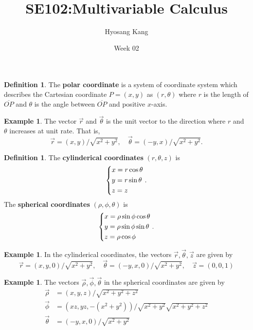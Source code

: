\documentclass{beamer}
\title[]{SE102:Multivariable Calculus}
\author[]{Hyosang Kang\inst{1}}
\institute[]{\inst{1}Division of Mathematics\\ School of Interdisciplinary Studies\\ DGIST}
\date[]{Week 02}
\theoremstyle{plain}
\theoremstyle{definition}
\newtheorem{defn}[thm]{Definition}
\newtheorem{exmp}[thm]{Example}
\begin{document}
\begin{frame}
\titlepage
\end{frame}

\begin{frame}
\begin{defn}
	The \textbf{polar coordinate} is a system of coordinate system
	which describes the Cartesian coordinate $P=(x,y)$
	as $(r,\theta)$ where $r$ is the length of
	$\overline{OP}$ and $\theta$ is the angle between 
	$\overline{OP}$ and positive $x$-axis.
\end{defn}
\begin{exmp}
	The vector $\vec r$ and $\vec\theta$ is the
	unit vector to the direction where $r$ and 
	$\theta$ increases at unit rate. That is,
	$$\vec r = (x,y)/\sqrt{x^2+y^2},\quad
	\vec \theta = (-y, x)/\sqrt{x^2+y^2}.$$
\end{exmp}
\end{frame}

\begin{frame}
\begin{defn}
	The \textbf{cylinderical
	coordinates} $(r,\theta,z)$ is 
	$$\begin{dcases}
		x = r\cos\theta \\
		y = r\sin\theta \\
		z = z \end{dcases}.$$
	The \textbf{spherical
	coordinates} $(\rho,\phi,\theta)$ is
	$$\begin{dcases}
		x = \rho\sin\phi\cos\theta \\
		y = \rho\sin\phi\sin\theta \\
		z = \rho\cos\phi \end{dcases}.$$
\end{defn}
\end{frame}

\begin{frame}
\begin{exmp}
	In the cylinderical coordinates, the vectors
	$\vec r, \vec \theta, \vec z$ are given by
	$$\vec r = (x,y,0)/\sqrt{x^2+y^2},\quad
	\vec \theta = (-y,x,0)/\sqrt{x^2+y^2},\quad
	\vec z = (0,0,1)$$
\end{exmp}
\begin{exmp}
	The vectors $\vec\rho, \vec\phi, 
	\vec\theta$ in the spherical coordinates are 
	given by
	\begin{align*}
	\vec\rho &= (x,y,z)/\sqrt{x^2+y^2+z^2}\\
	\vec\phi &= (xz,yz,-(x^2+y^2))/\sqrt{x^2+y^2}
	\sqrt{x^2+y^2+z^2}\\
	\vec\theta &= (-y,x,0)/\sqrt{x^2+y^2}
	\end{align*} 
\end{exmp}
\end{frame}
\end{document}
